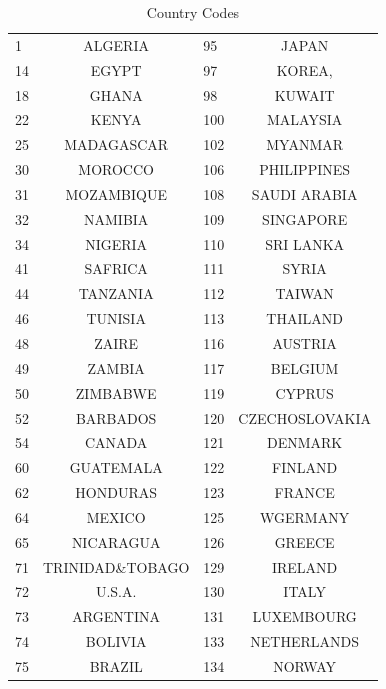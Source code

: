 \documentclass{scrartcl}
\begin{document}
	
	\begin{table}[h!]\caption{Country Codes}\label{tab:imp}
	\begin{center}
	
\begin{tabular}{|l|c|l|c|}

\hline

1 & ALGERIA     &       95  &JAPAN       \\
14& EGYPT       &       97  &KOREA,      \\
18& GHANA       &       98  &KUWAIT      \\
22& KENYA       &       100 &MALAYSIA    \\
25& MADAGASCAR  &       102 &MYANMAR    \\
30& MOROCCO     &       106 &PHILIPPINES     \\
31& MOZAMBIQUE  &       108 &SAUDI ARABIA    \\
32& NAMIBIA     &       109 &SINGAPORE   \\
34& NIGERIA     &       110 &SRI LANKA   \\
41& SAFRICA     &       111 &SYRIA       \\
44& TANZANIA    &       112 &TAIWAN      \\
46& TUNISIA     &       113 &THAILAND    \\
48& ZAIRE       &       116 &AUSTRIA     \\
49& ZAMBIA      &       117 &BELGIUM    \\
50& ZIMBABWE    &       119 &CYPRUS      \\
52& BARBADOS    &       120 &CZECHOSLOVAKIA  \\
54& CANADA      &       121 &DENMARK     \\
60& GUATEMALA   &       122 &FINLAND    \\
62& HONDURAS    &       123 &FRANCE      \\
64& MEXICO      &       125 &WGERMANY    \\
65& NICARAGUA   &       126 &GREECE      \\
71& TRINIDAD\&TOBAGO&       129 &IRELAND    \\
72& U.S.A.      &       130 &ITALY       \\
73& ARGENTINA   &       131 &LUXEMBOURG  \\
74& BOLIVIA     &       133 &NETHERLANDS     \\
75& BRAZIL      &       134 &NORWAY      \\

\end{tabular}
\end{center}
\end{table}
\end{document}
